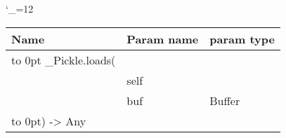\begingroup \catcode`\_=12 \tt
\begin{tabular}{lll}
\toprule
\textrm{Name}&\textrm{Param name}&\textrm{param type}\\
\midrule
\hbox to 0pt {_Pickle.loads(\hss}\\
& self\\
& buf & Buffer\\
\hbox to 0pt{) -> Any\hss}\\
\bottomrule
\end{tabular}
\endgroup
